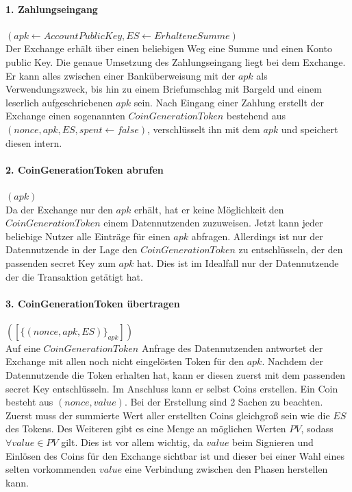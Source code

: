\documentclass[11pt,a4paper]{scrreprt}
\begin{document}
\paragraph{1. Zahlungseingang} $(apk \leftarrow AccountPublicKey, ES \leftarrow ErhalteneSumme)$\\
Der Exchange erhält über einen beliebigen Weg eine Summe und einen Konto public Key. Die genaue Umsetzung des Zahlungseingang liegt bei dem Exchange. Er kann alles zwischen einer Banküberweisung mit der $apk$ als Verwendungszweck, bis hin zu einem Briefumschlag mit Bargeld und einem leserlich aufgeschriebenen $apk$ sein. Nach Eingang einer Zahlung erstellt der Exchange einen sogenannten $CoinGenerationToken$ bestehend aus $(nonce, apk, ES, spent \leftarrow false)$, verschlüsselt ihn mit dem $apk$ und speichert diesen intern.

\paragraph{2. CoinGenerationToken abrufen} $(apk)$\\
Da der Exchange nur den $apk$ erhält, hat er keine Möglichkeit den $CoinGenerationToken$ einem Datennutzenden zuzuweisen. Jetzt kann jeder beliebige Nutzer alle Einträge für einen $apk$ abfragen. Allerdings ist nur der Datennutzende in der Lage den $CoinGenerationToken$ zu entschlüsseln, der den passenden secret Key zum $apk$ hat. Dies ist im Idealfall nur der Datennutzende der die Transaktion getätigt hat.

\paragraph{3. CoinGenerationToken übertragen} $([\{(nonce, apk, ES)\}_{apk}])$\\
Auf eine $CoinGenerationToken$ Anfrage des Datennutzenden antwortet der Exchange mit allen noch nicht eingelösten Token für den $apk$. Nachdem der Datennutzende die Token erhalten hat, kann er diesen zuerst mit dem passenden secret Key entschlüsseln. Im Anschluss kann er selbst Coins erstellen. Ein Coin besteht aus $(nonce, value)$. Bei der Erstellung sind 2 Sachen zu beachten. Zuerst muss der summierte Wert aller erstellten Coins gleichgroß sein wie die $ES$ des Tokens. Des Weiteren gibt es eine Menge an möglichen Werten $PV$, sodass $\forall value\in  PV$ gilt. Dies ist vor allem wichtig, da $value$ beim Signieren und Einlösen des Coins für den Exchange sichtbar ist und dieser bei einer Wahl eines selten vorkommenden $value$ eine Verbindung zwischen den Phasen herstellen kann.
\end{document}
